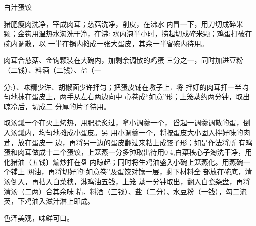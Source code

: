 \begin{recipe}[如意蛋饺]{白汁蛋饺}

\ingredients



\cooking

\step 	猪肥瘦肉洗净，宰成肉茸；慈菇洗净，削皮，在沸水 内冒一下，用刀切成碎米颗；金钩用温热水淘洗干净，在沸: 水内泡半小时，捞起切成碎米颗；鸡蛋打破在碗内调散，以 一半在锅内摊成一张大蛋皮，其余一半留碗内待用。

\step 	肉茸合慈菇、金钩颗装在大碗内，加剩余调散的鸡蛋 三分之一，同时加进豆粉（二钱）、料酒（二钱）、盐（一

分:）、味精少许、胡椒面少许拌匀；把蛋皮铺在墩子上，将 拌好的肉茸扞一半均匀地抹在蛋皮上，两手从左右两边向中 心卷成“如意”形；上笼蒸约两分钟，取出晾冷后，切成二 分厚的片子待用。

\step 取汤瓢一个在火上烤热，用肥膘炙过，拿小调羹一个， 舀起一调羹调散的蛋，倒入汤瓢内，均匀地摊成小蛋皮。另 用小调羹一个，将按蛋皮大小固入拌好味的肉茸，放在蛋皮一 边，再将另一边的蛋皮翻过来粘上成饺子形；如是作法将所 有鸡蛋和肉茸做成十二个蛋饺，上笼蒸一分多钟取出待用0 4,白菜秧心子淘洗干净，用化猪油（五钱〕煸炒扞在盘 内晾起；同时将生鸡油盛入小碗上笼蒸化。用蒸碗一个铺上 网油，再将切好的“如意卷”及蛋饺对镶一层，剩下材料全 部放在碗底，清汤倒入，再拈入白菜秧，淋鸡油五钱，上笼 蒸一分钟取出，翻入白瓷条盘，再将清汤（二两）合其余味 精、料酒（三钱）、盐（二分）、水豆粉（一钱），勾二流 芡，下鸡油入滋汁淋上即成。

\notes

色泽美观，味鲜可口。

\end{recipe}

